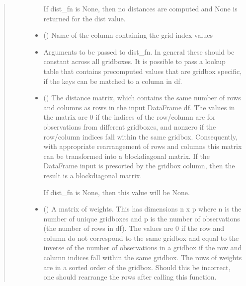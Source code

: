 \documentclass[letterpaper,10pt,english]{sphinxmanual}
\begin{document}
\begin{fulllineitems}
\begin{quote}
\begin{description}
\begin{itemize}
\sphinxAtStartPar
If dist\_fn is None, then no distances are computed and None is returned
for the dist value.


\item {}
\sphinxAtStartPar
{} () \textendash{} Name of the column containing the grid index values

\item {}
\sphinxAtStartPar
{} \textendash{} Arguments to be passed to dist\_fn. In general these should be constant
across all gridboxes. It is possible to pass a look\sphinxhyphen{}up table that
contains pre\sphinxhyphen{}computed values that are gridbox specific, if the keys can
be matched to a column in df.

\end{itemize}

\sphinxAtStartPar
{}

\sphinxAtStartPar
\begin{itemize}
\item {}
\sphinxAtStartPar
{} () \textendash{} The distance matrix, which contains the same number of rows and columns
as rows in the input DataFrame df. The values in the matrix are 0 if the
indices of the row/column are for observations from different gridboxes,
and non\sphinxhyphen{}zero if the row/column indices fall within the same gridbox.
Consequently, with appropriate re\sphinxhyphen{}arrangement of rows and columns this
matrix can be transformed into a block\sphinxhyphen{}diagonal matrix. If the DataFrame
input is pre\sphinxhyphen{}sorted by the gridbox column, then the result is a
block\sphinxhyphen{}diagonal matrix.

\sphinxAtStartPar
If dist\_fn is None, then this value will be None.

\item {}
\sphinxAtStartPar
{} () \textendash{} A matrix of weights. This has dimensions n x p where n is the number of
unique gridboxes and p is the number of observations (the number of rows
in df). The values are 0 if the row and column do not correspond to the
same gridbox and equal to the inverse of the number of observations in a
gridbox if the row and column indices fall within the same gridbox. The
rows of weights are in a sorted order of the gridbox. Should this be
incorrect, one should re\sphinxhyphen{}arrange the rows after calling this function.

\end{itemize}


\end{description}\end{quote}

\end{fulllineitems}
\end{document}
